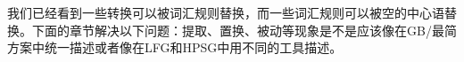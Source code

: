 
我们已经看到一些转换可以被词汇规则替换，而一些词汇规则可以被空的中心语替换。下面的章节解决以下问题：提取、置换、被动等现象是不是应该像在GB/最简方案中统一描述或者像在LFG和HPSG中用不同的工具描述。


